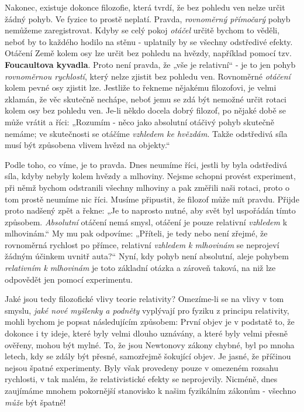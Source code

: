{    Nakonec, existuje dokonce filozofie, která tvrdí, že bez pohledu ven nelze určit žádný pohyb. 
    Ve fyzice to prostě neplatí. Pravda, \emph{rovnoměrný přímočarý} pohyb nemůžeme zaregistrovat. 
    Kdyby se celý pokoj \emph{otáčel} určitě bychom to věděli, neboť by to každého hodilo na stěnu 
    - uplatnily by se všechny odstředivé efekty. Otáčení Země kolem osy lze určit bez pohledu na 
    hvězdy, například pomocí tzv. \textbf{Foucaultova kyvadla}. Proto není pravda, že „vše je 
    relativní“ - je to jen pohyb \emph{rovnoměrnou rychlostí}, který nelze zjistit bez pohledu ven. 
    Rovnoměrné \emph{otáčení} kolem pevné osy zjistit lze. Jestliže to řekneme nějakému filozofovi, 
    je velmi zklamán, že věc skutečně nechápe, neboť jemu se zdá být nemožné určit rotaci kolem osy 
    bez pohledu ven. Je-li někdo docela dobrý filozof, po nějaké době se může vrátit a říci: 
    „Rozumím - něco jako absolutní otáčivý pohyb skutečně nemáme; ve skutečnosti se otáčíme 
    \emph{vzhledem ke hvězdám}. Takže odstředivá síla musí být způsobena vlivem hvězd na objekty.“
    
    Podle toho, co víme, je to pravda. Dnes neumíme říci, jestli by byla odstředivá síla, kdyby 
    nebyly kolem hvězdy a mlhoviny. Nejsme schopni provést experiment, při němž bychom odstranili 
    všechny mlhoviny a pak změřili naši rotaci, proto o tom prostě neumíme nic říci. Musíme 
    připustit, že filozof může mít pravdu. Přijde proto nadšený zpět a řekne: „Je to naprosto 
    nutné, aby svět byl uspořádán tímto způsobem. \emph{Absolutní} otáčení nemá smysl, otáčení je 
    pouze relativní \emph{vzhledem} k mlhovinám.“ My mu pak odpovíme: „Příteli, je tedy nebo není 
    zřejmé, že rovnoměrná rychlost po přímce, relativní \emph{vzhledem k mlhovinám} se neprojeví 
    žádným účinkem uvnitř auta?“ Nyní, kdy pohyb není absolutní, aleje pohybem \emph{relativním k 
    mlhovinám} je toto základní otázka a zároveň taková, na niž lze odpovědět jen pomocí 
    experimentu.
    
    Jaké jsou tedy filozofické vlivy teorie relativity? Omezíme-li se na vlivy v tom smyslu, 
    \emph{jaké nové myšlenky a podněty} vyplývají pro fyziku z principu relativity, mohli bychom je 
    popsat následujícím způsobem: První objev je v podstatě to, že dokonce i ty ideje, které byly 
    velmi dlouho uznávány, a které byly velmi přesně ověřeny, mohou být mylné. To, že jsou 
    Newtonovy zákony chybné, byl po mnoha letech, kdy se zdály být přesné, samozřejmě šokující 
    objev. Je jasné, že příčinou nejsou špatné experimenty. Byly však provedeny pouze v omezeném 
    rozsahu rychlosti, v tak malém, že relativistické efekty se neprojevily. Nicméně, dnes 
    zaujímáme mnohem pokornější stanovisko k našim fyzikálním zákonům - všechno \emph{může} být 
    špatně!
    
}
